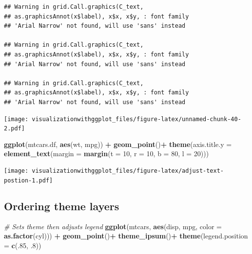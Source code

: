 \documentclass[]{krantz}
\makeatletter
\newenvironment{Shaded}{\begin{snugshade}}{\end{snugshade}}
\newcommand{\CommentTok}[1]{\textcolor[rgb]{0.56,0.35,0.01}{\textit{#1}}}
\newcommand{\DataTypeTok}[1]{\textcolor[rgb]{0.13,0.29,0.53}{#1}}
\newcommand{\DecValTok}[1]{\textcolor[rgb]{0.00,0.00,0.81}{#1}}
\newcommand{\FloatTok}[1]{\textcolor[rgb]{0.00,0.00,0.81}{#1}}
\newcommand{\KeywordTok}[1]{\textcolor[rgb]{0.13,0.29,0.53}{\textbf{#1}}}
\newcommand{\NormalTok}[1]{#1}
\newcommand{\OperatorTok}[1]{\textcolor[rgb]{0.81,0.36,0.00}{\textbf{#1}}}
\newcommand{\StringTok}[1]{\textcolor[rgb]{0.31,0.60,0.02}{#1}}
\newenvironment{kframe}{%
\medskip{}
\setlength{\fboxsep}{.8em}
 \def\at@end@of@kframe{}%
 \ifinner\ifhmode%
  \def\at@end@of@kframe{\end{minipage}}%
  \begin{minipage}{\columnwidth}%
 \fi\fi%
 \def\FrameCommand##1{\hskip\@totalleftmargin \hskip-\fboxsep
 \colorbox{shadecolor}{##1}\hskip-\fboxsep
     \hskip-\linewidth \hskip-\@totalleftmargin \hskip\columnwidth}%
 \MakeFramed {\advance\hsize-\width
   \@totalleftmargin\z@ \linewidth\hsize
   \@setminipage}}%
 {\par\unskip\endMakeFramed%
 \at@end@of@kframe}
\renewenvironment{Shaded}{\begin{kframe}}{\end{kframe}}
\makeatother
\begin{document}
\begin{verbatim}
## Warning in grid.Call.graphics(C_text,
## as.graphicsAnnot(x$label), x$x, x$y, : font family
## 'Arial Narrow' not found, will use 'sans' instead

## Warning in grid.Call.graphics(C_text,
## as.graphicsAnnot(x$label), x$x, x$y, : font family
## 'Arial Narrow' not found, will use 'sans' instead

## Warning in grid.Call.graphics(C_text,
## as.graphicsAnnot(x$label), x$x, x$y, : font family
## 'Arial Narrow' not found, will use 'sans' instead
\end{verbatim}

\texttt{[image: visualizationwithggplot\_files/figure-latex/unnamed-chunk-40-2.pdf]}

\begin{Shaded}
\begin{Highlighting}[]
\KeywordTok{ggplot}\NormalTok{(mtcars.df, }\KeywordTok{aes}\NormalTok{(wt, mpg)) }\OperatorTok{+}\StringTok{ }
\StringTok{  }\KeywordTok{geom_point}\NormalTok{()}\OperatorTok{+}
\StringTok{  }\KeywordTok{theme}\NormalTok{(}\DataTypeTok{axis.title.y =} \KeywordTok{element_text}\NormalTok{(}\DataTypeTok{margin =} \KeywordTok{margin}\NormalTok{(}\DataTypeTok{t =} \DecValTok{10}\NormalTok{, }\DataTypeTok{r =} \DecValTok{10}\NormalTok{, }\DataTypeTok{b =} \DecValTok{80}\NormalTok{, }\DataTypeTok{l =} \DecValTok{20}\NormalTok{)))}
\end{Highlighting}
\end{Shaded}

\texttt{[image: visualizationwithggplot\_files/figure-latex/adjust-text-postion-1.pdf]}

\hypertarget{ordering-theme-layers}{%
\subsection{Ordering theme layers}\label{ordering-theme-layers}}

\begin{Shaded}
\begin{Highlighting}[]
\CommentTok{# Sets theme then adjusts legend}
\KeywordTok{ggplot}\NormalTok{(mtcars, }\KeywordTok{aes}\NormalTok{(disp,  mpg, }\DataTypeTok{color =} \KeywordTok{as.factor}\NormalTok{(cyl))) }\OperatorTok{+}\StringTok{ }\KeywordTok{geom_point}\NormalTok{()}\OperatorTok{+}\StringTok{ }
\StringTok{  }\KeywordTok{theme_ipsum}\NormalTok{()}\OperatorTok{+}
\StringTok{  }\KeywordTok{theme}\NormalTok{(}\DataTypeTok{legend.position =} \KeywordTok{c}\NormalTok{(.}\DecValTok{85}\NormalTok{, }\FloatTok{.8}\NormalTok{))}
\end{Highlighting}
\end{Shaded}
\end{document}
